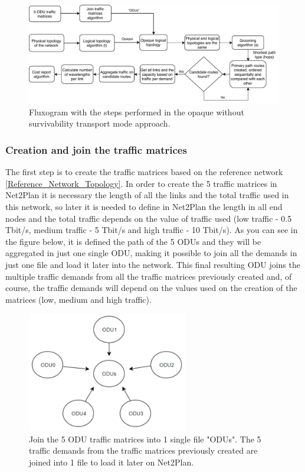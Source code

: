 \begin{figure}[H]
\centering
\includegraphics[width=16cm]{sdf/heuristic/opaque/figures/fluxogram_opaque_surv}
\caption{Fluxogram with the steps performed in the opaque without survivability transport mode approach.}
\label{fluxogram_opaque_surv}
\end{figure}

\newpage
\subsubsection{Creation and join the traffic matrices}

\noindent
The first step is to create the traffic matrices based on the reference network \ref{Reference_Network_Topology}. In order to create the 5 traffic matrices in Net2Plan it is necessary the length of all the links and the total traffic used in this network, so later it is needed to define in Net2Plan the length in all end nodes and the total traffic depends on the value of traffic used (low traffic - 0.5 Tbit/s, medium traffic - 5 Tbit/s and high traffic - 10 Tbit/s). As you can see in the figure below, it is defined the path of the 5 ODUs and they will be aggregated in just one single ODU, making it possible to join all the demands in just one file and load it later into the network. This final resulting ODU joins the multiple traffic demands from all the traffic matrices previously created and, of course, the traffic demands will depend on the values used on the creation of the matrices (low, medium and high traffic).

\begin{figure}[H]
\centering
\includegraphics[width=7cm]{sdf/heuristic/opaque/figures/join_matrices_odus}
\caption{Join the 5 ODU traffic matrices into 1 single file "ODUs". The 5 traffic demands from the traffic matrices previously created are joined into 1 file to load it later on Net2Plan.}
\label{join_matrices_odus_opaque_surv}
\end{figure}

